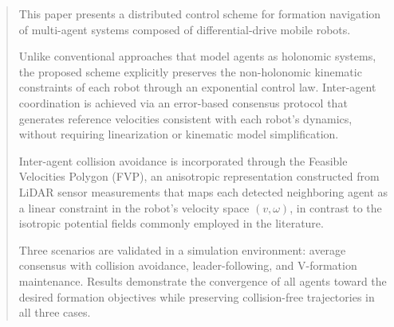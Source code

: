 \begin{abstract}
This paper presents a distributed control scheme for formation navigation of multi-agent systems composed of differential-drive mobile robots. 

Unlike conventional approaches that model agents as holonomic systems, the proposed scheme explicitly preserves the non-holonomic kinematic constraints of each robot through an exponential control law. Inter-agent coordination is achieved via an error-based consensus protocol that generates reference velocities consistent with each robot's dynamics, without requiring linearization or kinematic model simplification.

Inter-agent collision avoidance is incorporated through the Feasible Velocities Polygon (FVP), an anisotropic representation constructed from LiDAR sensor measurements that maps each detected neighboring agent as a linear constraint in the robot's velocity space $(v, \omega)$, in contrast to the isotropic potential fields commonly employed in the literature. 

Three scenarios are validated in a simulation environment: average consensus with collision avoidance, leader-following, and V-formation maintenance. Results demonstrate the convergence of all agents toward the desired formation objectives while preserving collision-free trajectories in all three cases.
\end{abstract}